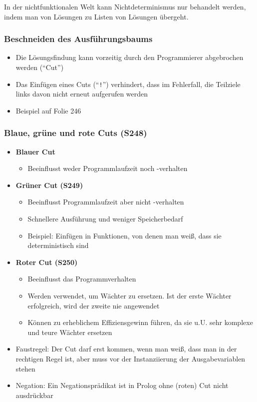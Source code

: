 In der nichtfunktionalen Welt kann Nichtdeterminismus nur behandelt werden, indem man von Lösungen zu Listen von Lösungen übergeht.

\subsubsection{Beschneiden des Ausführungsbaums}
\begin{itemize}
	\item Die Lösungsfindung kann vorzeitig durch den Programmierer abgebrochen werden ("`Cut"')
	\item Das Einfügen eines Cuts ("`\texttt{!}"') verhindert, dass im Fehlerfall, die Teilziele links davon nicht erneut aufgerufen werden
	\item Beispiel auf Folie 246
\end{itemize}

\subsubsection{Blaue, grüne und rote Cuts (S248)}
\begin{itemize}
	\item \textbf{Blauer Cut}
	\begin{itemize}
		\item Beeinflusst weder Programmlaufzeit noch -verhalten
	\end{itemize}
	\item \textbf{Grüner Cut (S249)}
	\begin{itemize}
		\item Beeinflusst Programmlaufzeit aber nicht -verhalten
		\item Schnellere Ausführung und weniger Speicherbedarf
		\item Beispiel: Einfügen in Funktionen, von denen man weiß, dass sie deterministisch sind
	\end{itemize}
	\item \textbf{Roter Cut (S250)}
	\begin{itemize}
		\item Beeinflusst das Programmverhalten
		\item Werden verwendet, um Wächter zu ersetzen. Ist der erste Wächter erfolgreich, wird der zweite nie angewendet
		\item Können zu erheblichem Effiziensgewinn führen, da sie u.U. sehr komplexe und teure Wächter ersetzen
	\end{itemize}
	\item Faustregel: Der Cut darf erst kommen, wenn man weiß, dass man in der rechtigen Regel ist, aber muss vor der Instanziierung der Ausgabevariablen stehen
	\item Negation: Ein Negationsprädikat ist in Prolog ohne (roten) Cut nicht ausdrückbar
\end{itemize}


